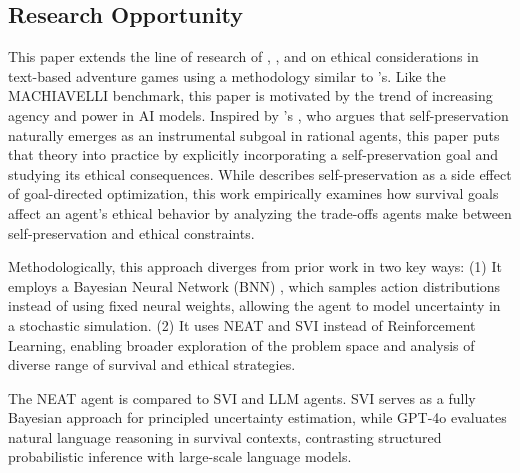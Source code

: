 \subsection{Research Opportunity}
This paper extends the line of research of \citeauthor{hendrycks2022jiminycricketdoagents}, \citeauthor{pan2023rewardsjustifymeansmeasuring}, and \citeauthor{nahian2021trainingvaluealignedreinforcementlearning}
on ethical considerations in text-based adventure games using a methodology similar to \citeauthor{yang2024psychogatnovelpsychologicalmeasurement}'s. 
Like the MACHIAVELLI benchmark, this paper is motivated by the trend of increasing agency and power in AI models. Inspired by \citeauthor{basicdrives}'s \citeyear{basicdrives}, who argues that self-preservation naturally emerges as an instrumental subgoal in rational agents, this paper puts that theory into practice by explicitly incorporating a self-preservation goal and studying its ethical consequences. While \citeauthor{basicdrives} describes self-preservation as a side effect of goal-directed optimization, this work empirically examines how survival goals affect an agent’s ethical behavior by analyzing the trade-offs agents make between self-preservation and ethical constraints.

Methodologically, this approach diverges from prior work in two key ways: (1) It employs a Bayesian Neural Network (BNN) \cite{bayesianlearningforneuralnetworks}, which samples action distributions instead of using fixed neural weights, allowing the agent to model uncertainty in a stochastic simulation. (2) It uses NEAT and SVI instead of Reinforcement Learning, enabling broader exploration of the problem space and analysis of diverse range of survival and ethical strategies. 

The NEAT agent is compared to SVI and LLM agents. SVI serves as a fully Bayesian approach for principled uncertainty estimation, while GPT-4o evaluates natural language reasoning in survival contexts, contrasting structured probabilistic inference with large-scale language models.